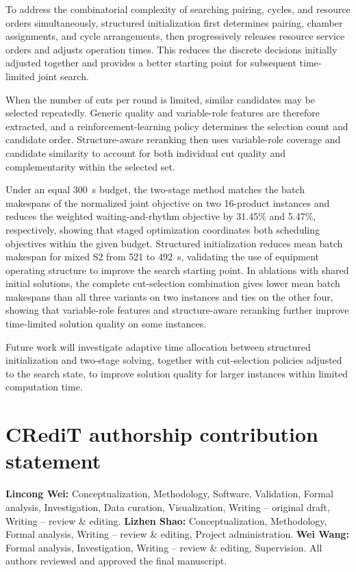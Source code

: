 \documentclass[final,5p,times,twocolumn]{elsarticle}
\begin{document}
To address the combinatorial complexity of searching pairing, cycles, and resource orders simultaneously, structured initialization first determines pairing, chamber assignments, and cycle arrangements, then progressively releases resource service orders and adjusts operation times. This reduces the discrete decisions initially adjusted together and provides a better starting point for subsequent time-limited joint search.

When the number of cuts per round is limited, similar candidates may be selected repeatedly. Generic quality and variable-role features are therefore extracted, and a reinforcement-learning policy determines the selection count and candidate order. Structure-aware reranking then uses variable-role coverage and candidate similarity to account for both individual cut quality and complementarity within the selected set.

Under an equal 300~s budget, the two-stage method matches the batch makespans of the normalized joint objective on two 16-product instances and reduces the weighted waiting-and-rhythm objective by 31.45\% and 5.47\%, respectively, showing that staged optimization coordinates both scheduling objectives within the given budget. Structured initialization reduces mean batch makespan for mixed S2 from 521 to 492~s, validating the use of equipment operating structure to improve the search starting point. In ablations with shared initial solutions, the complete cut-selection combination gives lower mean batch makespans than all three variants on two instances and ties on the other four, showing that variable-role features and structure-aware reranking further improve time-limited solution quality on some instances.

Future work will investigate adaptive time allocation between structured initialization and two-stage solving, together with cut-selection policies adjusted to the search state, to improve solution quality for larger instances within limited computation time.

\section*{CRediT authorship contribution statement}
\textbf{Lincong Wei:} Conceptualization, Methodology, Software, Validation, Formal analysis, Investigation, Data curation, Visualization, Writing -- original draft, Writing -- review \& editing.
\textbf{Lizhen Shao:} Conceptualization, Methodology, Formal analysis, Writing -- review \& editing, Project administration.
\textbf{Wei Wang:} Formal analysis, Investigation, Writing -- review \& editing, Supervision. All authors reviewed and approved the final manuscript.
\end{document}
